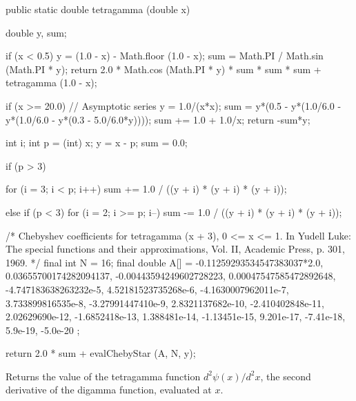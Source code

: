 \begin{code}

   public static double tetragamma (double x)\begin{hide} {
      double y, sum;

      if (x < 0.5) {
         y = (1.0 - x) - Math.floor (1.0 - x);
         sum = Math.PI / Math.sin (Math.PI * y);
         return 2.0 * Math.cos (Math.PI * y) * sum * sum * sum +
               tetragamma (1.0 - x);
      }

      if (x >= 20.0) {
         // Asymptotic series
         y = 1.0/(x*x);
         sum = y*(0.5 - y*(1.0/6.0 - y*(1.0/6.0 - y*(0.3 - 5.0/6.0*y))));
         sum += 1.0 + 1.0/x;
         return -sum*y;
      }

      int i;
      int p = (int) x;
      y = x - p;
      sum = 0.0;

      if (p > 3) {
         for (i = 3; i < p; i++)
            sum += 1.0 / ((y + i) * (y + i) * (y + i));

      } else if (p < 3) {
         for (i = 2; i >= p; i--)
            sum -= 1.0 / ((y + i) * (y + i) * (y + i));
      }

      /* Chebyshev coefficients for tetragamma (x + 3), 0 <= x <= 1. In Yudell
         Luke: The special functions and their approximations, Vol. II,
         Academic Press, p. 301, 1969. */
      final int N = 16;
      final double A[] = { -0.11259293534547383037*2.0, 0.03655700174282094137,
         -0.00443594249602728223, 0.00047547585472892648,
         -4.747183638263232e-5, 4.52181523735268e-6, -4.1630007962011e-7,
         3.733899816535e-8, -3.27991447410e-9, 2.8321137682e-10,
         -2.410402848e-11, 2.02629690e-12, -1.6852418e-13, 1.388481e-14,
         -1.13451e-15, 9.201e-17, -7.41e-18, 5.9e-19, -5.0e-20 };

      return 2.0 * sum + evalChebyStar (A, N, y);
   }\end{hide}
\end{code}
\begin{tabb}
   Returns the value of the tetragamma function $d^{2}\psi(x)/d^{2}x$, the second
   derivative of the digamma function, evaluated at $x$.
\end{tabb}
